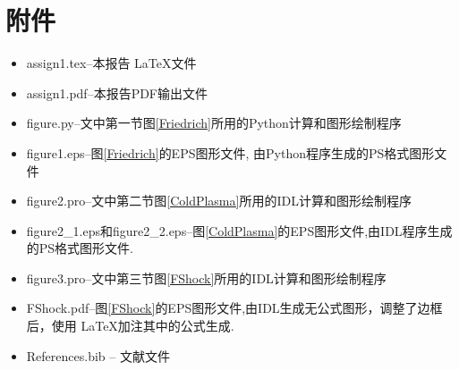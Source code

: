 \documentclass{article}
\begin{document}
	\section{附件}
	
	\begin{itemize}
		\item
		assign1.tex--本报告 \LaTeX 文件
		\item
		assign1.pdf--本报告PDF输出文件
		\item
		figure.py--文中第一节图\ref{Friedrich}所用的Python计算和图形绘制程序
		\item
		figure1.eps--图\ref{Friedrich}的EPS图形文件, 由Python程序生成的PS格式图形文件
		\item
		figure2.pro--文中第二节图\ref{ColdPlasma}所用的IDL计算和图形绘制程序
		\item 
		figure2\_1.eps和figure2\_2.eps--图\ref{ColdPlasma}的EPS图形文件,由IDL程序生成的PS格式图形文件.
		\item
		figure3.pro--文中第三节图\ref{FShock}所用的IDL计算和图形绘制程序
		\item 
		FShock.pdf--图\ref{FShock}的EPS图形文件,由IDL生成无公式图形，调整了边框后，使用
		\LaTeX 加注其中的公式生成.
		\item
		References.bib -- 文献文件
	\end{itemize}

	
	
	
	
\end{document}
